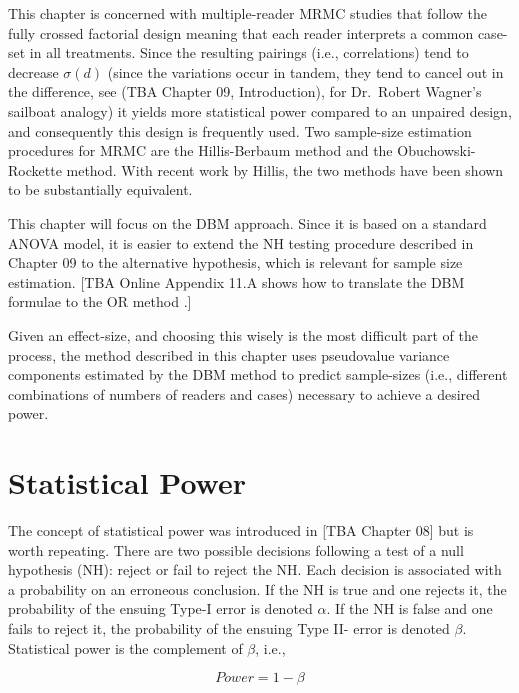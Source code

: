 \documentclass[
]{book}
\begin{document}
This chapter is concerned with multiple-reader MRMC studies that follow the fully crossed factorial design meaning that each reader interprets a common case-set in all treatments. Since the resulting pairings (i.e., correlations) tend to decrease \(\sigma(d)\) (since the variations occur in tandem, they tend to cancel out in the difference, see (TBA Chapter 09, Introduction), for Dr.~Robert Wagner's sailboat analogy) it yields more statistical power compared to an unpaired design, and consequently this design is frequently used. Two sample-size estimation procedures for MRMC are the Hillis-Berbaum method \citep{RN1476} and the Obuchowski-Rockette \citep{RN1971} method. With recent work by Hillis, the two methods have been shown to be substantially equivalent.

This chapter will focus on the DBM approach. Since it is based on a standard ANOVA model, it is easier to extend the NH testing procedure described in Chapter 09 to the alternative hypothesis, which is relevant for sample size estimation. {[}TBA Online Appendix 11.A shows how to translate the DBM formulae to the OR method \citep{RN2137}.{]}

Given an effect-size, and choosing this wisely is the most difficult part of the process, the method described in this chapter uses pseudovalue variance components estimated by the DBM method to predict sample-sizes (i.e., different combinations of numbers of readers and cases) necessary to achieve a desired power.

\hypertarget{StatPower1}{%
\section{Statistical Power}\label{StatPower1}}

The concept of statistical power was introduced in {[}TBA Chapter 08{]} but is worth repeating. There are two possible decisions following a test of a null hypothesis (NH): reject or fail to reject the NH. Each decision is associated with a probability on an erroneous conclusion. If the NH is true and one rejects it, the probability of the ensuing Type-I error is denoted \(\alpha\). If the NH is false and one fails to reject it, the probability of the ensuing Type II- error is denoted \(\beta\). Statistical power is the complement of \(\beta\), i.e.,

\begin{equation}
Power = 1 - \beta
\label{eq:DefinitionStatPower}
\end{equation}
\end{document}
